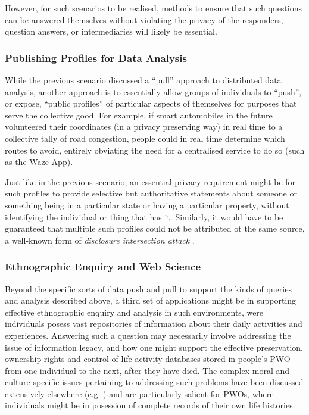 \documentclass{acm_proc_article-sp}
\begin{document}
However, for such scenarios to be realised, methods to ensure that such questions can be answered themselves without violating the privacy of the responders, question answers, or intermediaries will likely be essential. 

\subsubsection{Publishing Profiles for Data Analysis}

While the previous scenario discussed a ``pull'' approach to distributed data analysis, another approach is to essentially allow groups of individuals to ``push'', or expose, ``public profiles'' of particular aspects of themselves for purposes that serve the collective good.  For example, if smart automobiles in the future volunteered their coordinates (in a privacy preserving way) in real time to a collective tally of road congestion, people could in real time determine which routes to avoid, entirely obviating the need for a centralised service to do so (such as the Waze App\cite{blatt2013technological}). 

Just like in the previous scenario, an essential privacy requirement might be for such profiles to provide selective but authoritative statements about someone or something being in a particular state or having a particular property, without identifying the individual or thing that has it.  Similarly, it would have to be guaranteed that multiple such profiles could not be attributed ot the same source, a well-known form of \emph{disclosure intersection attack} \cite{danezis2005statistical}.

\subsubsection{Ethnographic Enquiry and Web Science}

Beyond the specific sorts of data push and pull to support the kinds of queries and analysis described above, a third set of applications might be in supporting effective ethnographic enquiry and analysis in such environments, were individuals posess vast repositories of information about their daily activities and experiences.  Answering such a question may necessarily involve addressing the issue of information legacy, and how one might support the effective preservation, ownership rights and control of life activity databases stored in people's PWO from one individual to the next, after they have died.  The complex moral and culture-specific issues pertaining to addressing such problems have been discussed extensively elsewhere (e.g. \cite{shields1996cultures,fernandez2001moral}) and are particularly salient for PWOs, where individuals might be in posession of complete records of their own life histories.
\end{document}
